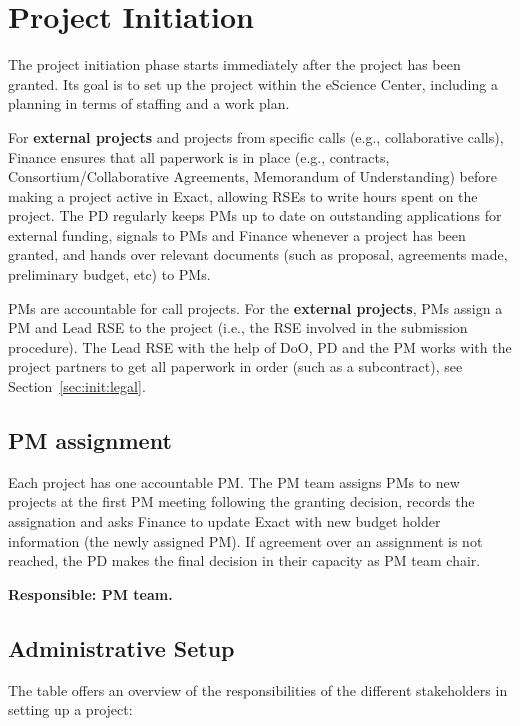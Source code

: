 \section{Project Initiation}
\label{sec:init}
The project initiation phase starts immediately after the project has been granted. Its goal is to set up the project
within the eScience Center, including a planning in terms of staffing and a work plan.

For \textbf{external projects} and projects from specific calls (e.g., collaborative calls), Finance ensures that all
paperwork is in place (e.g., contracts, Consortium/Collaborative Agreements, Memorandum of Understanding) before making
a project active in Exact, allowing RSEs to write hours spent on the project. The PD regularly keeps PMs up to date on
outstanding applications for external funding, signals to PMs and Finance whenever a project has been granted, and hands
over relevant documents (such as proposal, agreements made, preliminary budget, etc) to PMs. 

PMs are accountable for call projects. For the \textbf{external projects}, PMs assign a PM and Lead RSE to the project
(i.e., the RSE involved in the submission procedure). The Lead RSE with the help of DoO, PD and the PM works with the project partners
to get all paperwork in order (such as a subcontract), see Section~\ref{sec:init:legal}. 

\subsection{PM assignment}
\label{sec:init:pm-assign}
Each project has one accountable PM. The PM team assigns PMs to new projects at the first PM meeting following the
granting decision, records the assignation and asks Finance to update Exact with new budget holder information (the newly
assigned PM). If agreement over an assignment is not reached, the PD makes the final decision in their capacity as PM
team chair.

\textbf{Responsible: PM team.}

\subsection{Administrative Setup}
The table offers an overview of the responsibilities of the different stakeholders in setting up a project:

